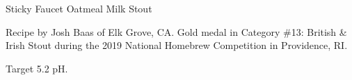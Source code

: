 \begin{recipe}{Sticky Faucet Oatmeal Milk Stout}

\begin{aboutblock}
Recipe by Josh Baas of Elk Grove, CA. Gold medal in Category \#13:
British \& Irish Stout during the 2019 National Homebrew Competition
in Providence, RI. \sourceaha
\end{aboutblock}


\begin{methodandtiming}
 
\begin{mashsteps}
\end{mashsteps}

\begin{fermentationsteps}
\end{fermentationsteps}

\begin{directions}
Target 5.2 pH.
\end{directions}

\end{methodandtiming}

\recipebreak

\begin{ingredientsblock}

\begin{malts}
\end{malts}

\begin{hops}
\end{hops}


\end{ingredientsblock}

\end{recipe}
